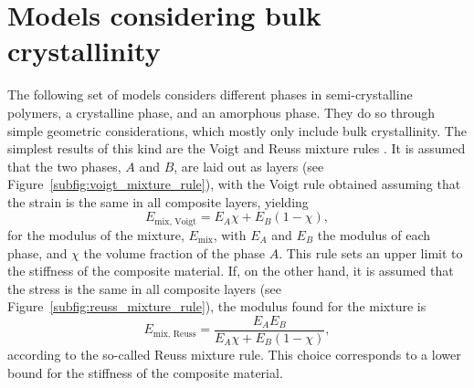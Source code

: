 \section{Models considering bulk crystallinity}
\label{sec:models_bulk_crystal}

The following set of models considers different phases in semi-crystalline polymers, a crystalline phase, and an amorphous phase.
They do so through simple geometric considerations, which mostly only include bulk crystallinity.
The simplest results of this kind are the Voigt and Reuss mixture rules \citep{wardIntroductionMechanicalProperties2004}.
It is assumed that the two phases, $A$ and $B$, are laid out as layers (see Figure~\ref{subfig:voigt_mixture_rule}), with the Voigt rule obtained assuming that the strain is the same in all composite layers, yielding
\begin{equation}
	\label{eq:voigt_mixture_rule}
	E_\text{mix, Voigt} = E_A \chi + E_B (1 - \chi),
\end{equation}
for the modulus of the mixture, $E_\text{mix}$, with $E_A$ and $E_B$ the modulus of each phase, and $\chi$ the volume fraction of the phase $A$.
This rule sets an upper limit to the stiffness of the composite material.
If, on the other hand, it is assumed that the stress is the same in all composite layers (see Figure~\ref{subfig:reuss_mixture_rule}), the modulus found for the mixture is
\begin{equation}
	E_\text{mix, Reuss} = \frac{E_A E_B}{E_A \chi + E_B (1-\chi)},
\end{equation}
according to the so-called Reuss mixture rule.
This choice corresponds to a lower bound for the stiffness of the composite material.
